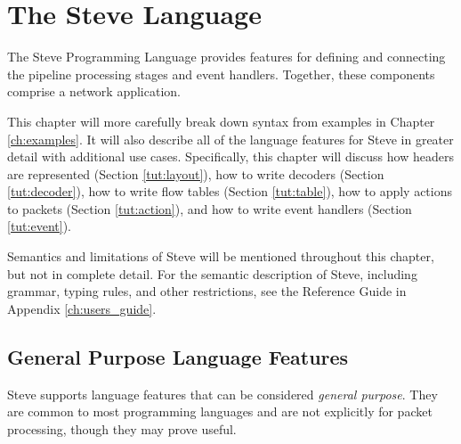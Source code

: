 \chapter{The Steve Language} \label{ch:tutorial}

%

The Steve Programming Language provides features for
defining and connecting the pipeline processing stages and event handlers. Together, these components comprise a network application.

This chapter will more carefully break down syntax from examples in Chapter \ref{ch:examples}. It will also describe all of the language features for Steve in greater detail with additional use cases. 
Specifically, this chapter will discuss how headers are represented (Section \ref{tut:layout}), how to
write decoders (Section \ref{tut:decoder}), how to write flow tables (Section \ref{tut:table}), how to apply actions to packets (Section \ref{tut:action}), and how to write event handlers (Section \ref{tut:event}).

Semantics and limitations of Steve will be mentioned throughout this chapter, 
but not in complete detail. For the semantic description of
Steve, including grammar, typing rules, and other restrictions, see the Reference Guide in Appendix \ref{ch:users_guide}.

\section{General Purpose Language Features} \label{tut:gen_purp}

Steve supports language features that can be considered
\textit{general purpose}. They are common to most programming
languages and are not explicitly for packet processing, though they may prove
useful.

